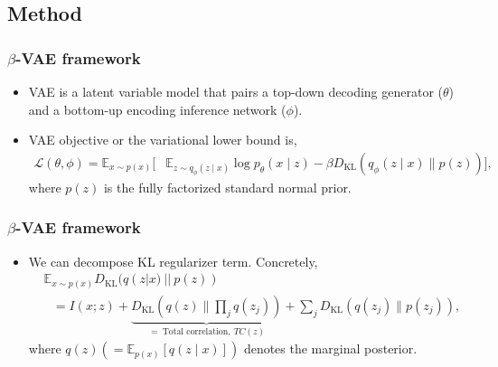 \documentclass[10pt,mathserif]{beamer}
\begin{document}
\subsection{Method}
\begin{frame}
\frametitle{$\beta$-VAE framework}
\begin{itemize}\itemsep=20pt
\item VAE is a latent variable model that pairs a top-down decoding generator ($\theta$) and a bottom-up encoding inference network ($\phi$).\pause
\item VAE objective or the variational lower bound is,
\begin{align}
\mathcal{L}(\theta,\phi) = \mathbb{E}_{x \sim p(x)} \big[&\mathbb{E}_{z \sim q_\phi(z \mid x)} \log p_\theta(x \mid z)- \beta D_\text{KL}\left(q_\phi(z \mid x) \parallel p(z)\right)\big],\nonumber
\end{align}
where $p(z)$ is the fully factorized standard normal prior.
\end{itemize}
\end{frame}

\begin{frame}
\frametitle{$\beta$-VAE framework}
\begin{itemize}\itemsep=12pt
\item We can decompose KL regularizer term. Concretely,
\begin{align}
&\mathbb{E}_{x \sim p(x)} D_\text{KL}(q(z| x) ~||~ p(z))\nonumber \\
&~~~=I(x;z) + \underbrace{D_\text{KL}(q(z) \parallel \prod_j q(z_j))}_{=~\text{Total correlation},~ TC(z)} + \sum_j D_\text{KL}(q(z_j) \parallel p(z_j)),\nonumber
\end{align}
        where $q(z)(=\mathbb{E}_{p(x)}[q(z\!\mid\!x)])$ denotes the marginal posterior. 
\end{itemize}
\end{frame}
\end{document}
